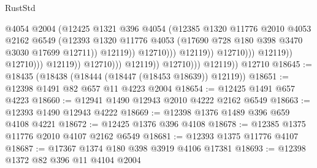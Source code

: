 \begin{lexlean}{RustStd}
\begin{coremodule}
                                                      @4054
                                                      @2004
                                                      (@12425
                                                        @1321
                                                        @396
                                                        @4054
                                                        (@12385
                                                          @1320
                                                          @11776
                                                          @2010
                                                          @4053
                                                          @2162
                                                          @6549
                                                          (@12393
                                                            @1320
                                                            @11776
                                                            @4053
                                                            (@17690
                                                              @728
                                                              @180
                                                              @398
                                                              @3470
                                                              @3030
                                                              @17699
                                                              @12711))
                                                          @12119))
                                                      @12710)))
                                                @12119))
                                            @12710)))
                                      @12119))
                                  @12710)))
                            @12119))
                        @12710)))
                  @12119))
              @12710)))
        @12119))
    @12710
@18645 := @18435 (@18438 (@18444 (@18447 (@18453 @18639)) @12119))
@18651 := @12398 @1491 @82 @657 @11 @4223 @2004
@18654 := @12425 @1491 @657 @4223
@18660 := @12941 @1490 @12943 @2010 @4222 @2162 @6549
@18663 := @12393 @1490 @12943 @4222
@18669 := @12398 @1376 @1489 @396 @659 @4108 @4221
@18672 := @12425 @1376 @396 @4108
@18678 := @12385 @1375 @11776 @2010 @4107 @2162 @6549
@18681 := @12393 @1375 @11776 @4107
@18687 := @17367 @1374 @180 @398 @3919 @4106 @17381
@18693 := @12398 @1372 @82 @396 @11 @4104 @2004

\end{coremodule}
\end{lexlean}
